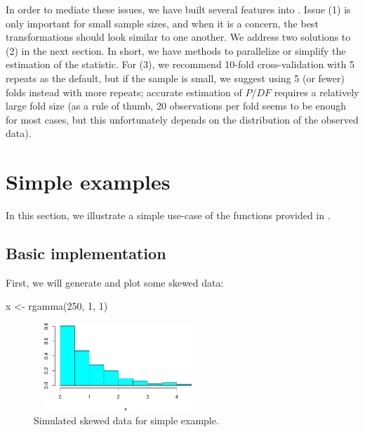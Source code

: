 In order to mediate these issues, we have built several features into
. Issue (1) is only important for small sample sizes,
and when it is a concern, the best transformations should look similar
to one another. We address two solutions to (2) in the next section. In
short, we have methods to parallelize or simplify the estimation of the
statistic. For (3), we recommend 10-fold cross-validation with 5 repeats
as the default, but if the sample is small, we suggest using 5 (or
fewer) folds instead with more repeats; accurate estimation of \(P/DF\)
requires a relatively large fold size (as a rule of thumb, 20
observations per fold seems to be enough for most cases, but this
unfortunately depends on the distribution of the observed data).

\hypertarget{simple-examples}{%
\section{Simple examples}\label{simple-examples}}

In this section, we illustrate a simple use-case of the functions
provided in .

\hypertarget{basic-implementation}{%
\subsection{Basic implementation}\label{basic-implementation}}

First, we will generate and plot some skewed data:

\begin{Schunk}
\begin{Sinput}
x <- rgamma(250, 1, 1)
\end{Sinput}
\end{Schunk}

\begin{Schunk}
\begin{figure}

{\centering \includegraphics[width=2.5in,height=1.3in]{figs/simplehist-1} 

}

\caption[Simulated skewed data for simple example]{Simulated skewed data for simple example.}\label{fig:simplehist}
\end{figure}
\end{Schunk}


